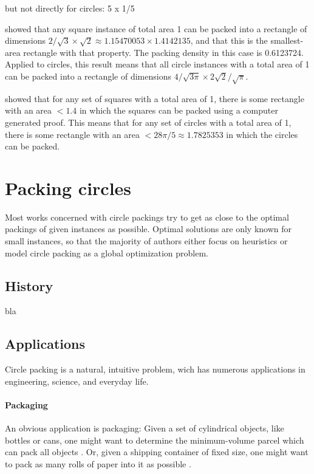 \documentclass[a4paper,style=print,bibliography=totoc,nexus,lnum,extramargin]{tubsbook}
\begin{document}
but not directly for circles: 5 x 1/5

\textcite{KK1975optimal} showed that any square instance of total area 1 can be packed into a rectangle of dimensions $2/\sqrt{3} \times \sqrt{2} \approx 1.15470053 \times 1.4142135$, and that this is the smallest-area rectangle with that property. The packing density in this case is 0.6123724. Applied to circles, this result means that all circle instances with a total area of 1 can be packed into a rectangle of dimensions $4/\sqrt{3\pi} \times 2\sqrt{2}/\sqrt{\pi}$.

\textcite{hougardy2011packing} showed that for any set of squares with a total area of 1, there is some rectangle with an area $< 1.4$ in which the squares can be packed using a computer generated proof. This means that for any set of circles with a total area of 1, there is some rectangle with an area $< 28\pi/5 \approx 1.7825353$ in which the circles can be packed.

\section{Packing circles}

Most works concerned with circle packings try to get as close to the optimal packings of given instances as possible. Optimal solutions are only known for small instances, so that the majority of authors either focus on heuristics or model circle packing as a global optimization problem.

\subsection{History}

bla

\subsection{Applications}

Circle packing is a natural, intuitive problem, wich has numerous applications in engineering, science, and everyday life.

\paragraph{Packaging}

An obvious application is packaging: Given a set of cylindrical objects, like bottles or cans, one might want to determine the minimum-volume parcel which can pack all objects \parencite{CKP2008solving}. Or, given a shipping container of fixed size, one might want to pack as many rolls of paper into it as possible \parencite{fraser1994integrated}.
\end{document}
